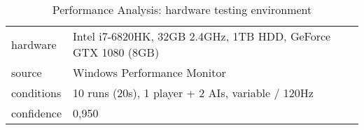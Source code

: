 \begin{table}[!ht]
	\centering
    \begin{tabular}{l|l}
        hardware & Intel i7-6820HK, 32GB 2.4GHz, 1TB HDD, GeForce GTX 1080 (8GB) \\
		source & Windows Performance Monitor \\
		conditions & 10 runs (20s), 1 player + 2 AIs, variable / 120Hz \\
		confidence & 0,950 \\
    \end{tabular}

    \caption{Performance Analysis: hardware testing environment}\label{tb:performance:hardware}
\end{table}
